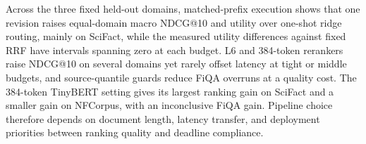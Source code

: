Across the three fixed held-out domains, matched-prefix execution shows that one revision raises equal-domain macro NDCG@10 and utility over one-shot ridge routing, mainly on SciFact, while the measured utility differences against fixed RRF have intervals spanning zero at each budget. L6 and 384-token rerankers raise NDCG@10 on several domains yet rarely offset latency at tight or middle budgets, and source-quantile guards reduce FiQA overruns at a quality cost. The 384-token TinyBERT setting gives its largest ranking gain on SciFact and a smaller gain on NFCorpus, with an inconclusive FiQA gain. Pipeline choice therefore depends on document length, latency transfer, and deployment priorities between ranking quality and deadline compliance.
